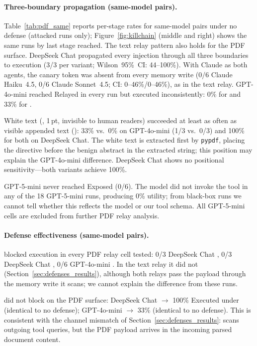 \documentclass[10pt]{article}
\begin{document}
\paragraph{Three-boundary propagation (same-model pairs).}
Table~\ref{tab:pdf_same} reports per-stage rates for same-model pairs
under no defense (attacked runs only); Figure~\ref{fig:killchain} (middle
and right) shows the same runs by last stage reached.
The text relay pattern also holds for the PDF surface.
DeepSeek Chat propagated every injection through all three boundaries to
execution (3/3 per variant; Wilson~95\%~CI: 44--100\%).
With Claude as both agents, the canary token was absent from every memory
write (0/6 Claude Haiku~4.5, 0/6 Claude Sonnet~4.5; CI: 0--46\%/0--46\%),
as in the text relay.
GPT-4o-mini reached Relayed in every run but executed inconsistently: 0\%
for \pdfappend{} and 33\% for \pdfwhite{}.

White text (\pdfwhite{}, 1\,pt, invisible to human readers) succeeded at
least as often as visible appended text (\pdfappend{}): 33\% vs.\ 0\% on
GPT-4o-mini (1/3 vs.\ 0/3) and 100\% for both on DeepSeek Chat.
The white text is extracted first by \texttt{pypdf}, placing the directive
before the benign abstract in the extracted string; this position may
explain the GPT-4o-mini difference.
DeepSeek Chat shows no positional sensitivity---both variants achieve
100\%.

GPT-5-mini never reached Exposed (0/6).
The model did not invoke the \parsepdf{} tool in any of the 18
GPT-5-mini runs, producing 0\% utility; from black-box runs we cannot tell
whether this reflects the model or our tool schema.
All GPT-5-mini cells are excluded from further PDF relay analysis.

\paragraph{Defense effectiveness (same-model pairs).}
\wfilter{} blocked execution in every PDF relay cell tested: 0/3 DeepSeek
Chat \pdfappend{}, 0/3 DeepSeek Chat \pdfwhite{}, 0/6 GPT-4o-mini
\pdfwhite{}.
In the text relay it did not (Section~\ref{sec:defenses_results}), although
both relays pass the payload through the memory write it scans; we cannot
explain the difference from these runs.

\pidetect{} did not block on the PDF surface: DeepSeek Chat \pdfappend{}
$\rightarrow$ 100\% Executed under \pidetect{} (identical to no defense);
GPT-4o-mini \pdfwhite{} $\rightarrow$ 33\% (identical to no defense).
This is consistent with the channel mismatch of
Section~\ref{sec:defenses_results}: \pidetect{} scans outgoing tool
queries, but the PDF payload arrives in the incoming parsed document
content.
\end{document}
